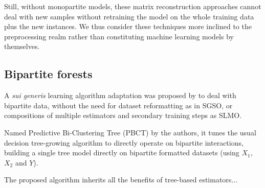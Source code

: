 Still, without monopartite models, these matrix reconstruction approaches cannot
deal with new samples without retraining the model on the whole training data
plus the new instances. We thus consider these techniques more inclined to the
preprocessing realm rather than constituting machine learning models by
themselves.



\subsection{Bipartite forests}
\label{sec:bipartite_forests}

A \textit{sui generis} learning algorithm adaptation was proposed by \citet{pliakos2018} to deal with bipartite data, without the need for dataset reformatting as in SGSO, or compositions of multiple estimators and secondary training steps as SLMO.

Named Predictive Bi-Clustering Tree (PBCT) by the authors, it tunes the usual decision tree-growing algorithm to directly operate on bipartite interactions, building a single tree model directly on bipartite formatted datasets (using $X_1$, $X_2$ and $Y$).

The proposed algorithm inherits all the benefits of tree-based estimators...%


